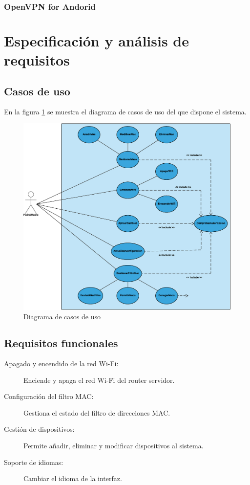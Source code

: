 \documentclass[12pt]{article}
\begin{document}
        \subsubsection{OpenVPN for Andorid}


\section{Especificación y análisis de requisitos}
    
    \subsection{Casos de uso}
        En la figura \ref{fig:case_use_diagram} se muestra el diagrama de casos de uso del que dispone el sistema.
        \begin{figure}[h!]
        \centering
            \includegraphics[scale=0.35]{case_use_diagram.eps}
            \caption{Diagrama de casos de uso}
            \label{fig:case_use_diagram}
        \end{figure}
    
    \subsection{Requisitos funcionales}
    \begin{description}
        \item[Apagado y encendido de la red Wi-Fi:] Enciende y apaga el red Wi-Fi del router servidor. 
        \item[Configuración del filtro MAC:] Gestiona el estado del filtro de direcciones MAC.
        \item[Gestión de dispositivos:] Permite añadir, eliminar y modificar dispositivos al sistema.
        \item[Soporte de idiomas:] Cambiar el idioma de la interfaz.
    \end{description}
    
\end{document}
